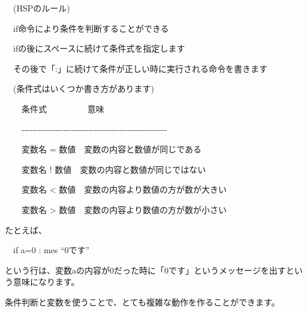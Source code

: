 \documentclass[a4paper,dvipdfmx]{jarticle}
\begin{document}
\bigskip


\bigskip


\bigskip


\bigskip


\bigskip


\bigskip


\bigskip


\bigskip


\bigskip


\bigskip


\bigskip


\bigskip


\bigskip


\bigskip


\bigskip


\bigskip


\bigskip

\ \ (HSPのルール)


\bigskip

\ \ if命令により条件を判断することができる

\ \ ifの後にスペースに続けて条件式を指定します

\ \ その後で「:」に続けて条件が正しい時に実行される命令を書きます


\bigskip

\ \ (条件式はいくつか書き方があります)


\bigskip

\ \ \ \ 条件式 \ \ \ \ \ \ \ \ \ 意味

\ \ \ \ {}-{}-{}-{}-{}-{}-{}-{}-{}-{}-{}-{}-{}-{}-{}-{}-{}-{}-{}-{}-{}-{}-{}-{}-{}-{}-{}-{}-{}-{}-{}-{}-{}-{}-{}-{}-{}-{}-{}-{}-{}-{}-{}-{}-{}-{}-{}-{}-{}-{}-{}-{}-

\ \ \ \ 変数名 =
数値\ \ 変数の内容と数値が同じである

\ \ \ \ 変数名 !
数値\ \ 変数の内容と数値が同じではない

\ \ \ \ 変数名 {\textless}
数値\ \ 変数の内容より数値の方が数が大きい

\ \ \ \ 変数名 {\textgreater}
数値\ \ 変数の内容より数値の方が数が小さい



\bigskip

たとえば、


\bigskip

\ \ if a=0 : mes “0です”


\bigskip

という行は、変数aの内容が0だった時に「0です」というメッセージを出すという意味になります。

条件判断と変数を使うことで、とても複雑な動作を作ることができます。
\end{document}
